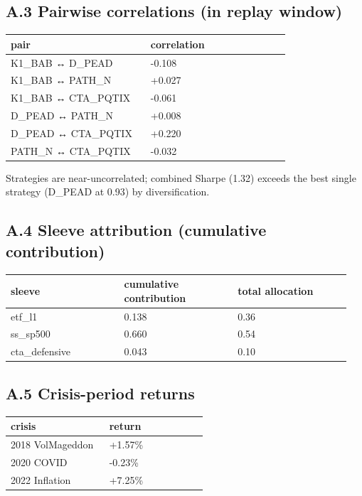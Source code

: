\documentclass[11pt,a4paper]{article}
\begin{document}
\subsection{A.3 Pairwise correlations (in replay window)}

\begin{center}
\small
\begin{tabular}{p{0.475\linewidth}p{0.475\linewidth}}
\toprule
\textbf{pair} & \textbf{correlation} \\
\midrule
K1\_BAB ↔ D\_PEAD & -0.108 \\
K1\_BAB ↔ PATH\_N & +0.027 \\
K1\_BAB ↔ CTA\_PQTIX & -0.061 \\
D\_PEAD ↔ PATH\_N & +0.008 \\
D\_PEAD ↔ CTA\_PQTIX & +0.220 \\
PATH\_N ↔ CTA\_PQTIX & -0.032 \\
\bottomrule
\end{tabular}
\end{center}

Strategies are near-uncorrelated; combined Sharpe (1.32) exceeds the best single strategy (D\_PEAD at 0.93) by diversification.

\subsection{A.4 Sleeve attribution (cumulative contribution)}

\begin{center}
\small
\begin{tabular}{p{0.317\linewidth}p{0.317\linewidth}p{0.317\linewidth}}
\toprule
\textbf{sleeve} & \textbf{cumulative contribution} & \textbf{total allocation} \\
\midrule
etf\_l1 & 0.138 & 0.36 \\
ss\_sp500 & 0.660 & 0.54 \\
cta\_defensive & 0.043 & 0.10 \\
\bottomrule
\end{tabular}
\end{center}

\subsection{A.5 Crisis-period returns}

\begin{center}
\small
\begin{tabular}{p{0.475\linewidth}p{0.475\linewidth}}
\toprule
\textbf{crisis} & \textbf{return} \\
\midrule
2018 VolMageddon & +1.57\% \\
2020 COVID & -0.23\% \\
2022 Inflation & +7.25\% \\
\bottomrule
\end{tabular}
\end{center}
\end{document}
